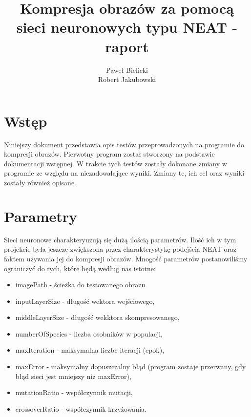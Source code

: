 \documentclass[12pt,a4paper,oneside]{article}
\begin{document}
\begin{titlepage}
\title{ Kompresja obrazów za pomocą sieci neuronowych typu NEAT - raport}
\maketitle


\begin{flushright}
\author{
\bigskip
Paweł Bielicki
\\Robert Jakubowski}
\end{flushright}

\end{titlepage}

\section{Wstęp}
Niniejszy dokument przedstawia opis testów przeprowadzonych na programie do kompresji obrazów. Pierwotny program został stworzony na podstawie dokumentacji wstępnej. W trakcie tych testów zostały dokonane zmiany w programie ze względu na niezadowalające wyniki. Zmiany te, ich cel oraz wyniki zostały również opisane.

\section{Parametry}
Sieci neuronowe charakteryuzują się dużą ilością parametrów. Ilość ich w tym projekcie była jeszcze zwiększona przez charakterystykę podejścia NEAT oraz faktem używania jej do kompresji obrazów. Mnogość parametrów postanowiliśmy ograniczyć do tych, które będą według nas istotne:
\begin{itemize}
	\item imagePath - ścieżka do testowanego obrazu
	\item inputLayerSize - długość wektora wejściowego,
	\item middleLayerSize - długość wekktora skompresowanego,
	\item numberOfSpecies - liczba osobników w populacji,
	\item maxIteration - maksymalna liczbe iteracji (epok),
	\item maxError - maksymalny dopuszczalny błąd (program zostaje przerwany, gdy błąd sieci jest mniejszy niż maxError),
	\item mutationRatio - współczynnik mutacji,
	\item crossoverRatio - współczynnik krzyżowania.
\end{itemize}
\end{document}
